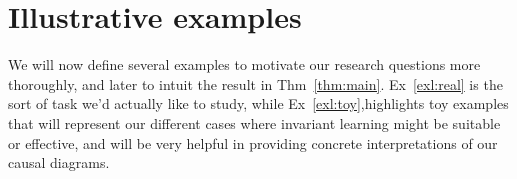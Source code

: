 \documentclass[12pt]{article}
\newcommand{\Ent}[1]{\operatorname{H}\left[#1\right]}
\newcommand{\E}[2][{}]{\mathbb{E}_{#1}\left[#2\right]}
\newcommand{\Prob}[1]{\operatorname{P}\left(#1\right)}
\newcommand{\toadd}[1]{\noindent\fbox{%
    \parbox{\textwidth}{%
        #1
    }%
}}
\theoremstyle{definition}
\newtheorem{dfn}[thm]{Definition}
\numberwithin{equation}{section}
\numberwithin{figure}{section}
\numberwithin{table}{section}
\begin{document}
    



\pagebreak
\section{Illustrative examples}
\label{sec:formalism}

We will now define several examples to motivate our research questions more thoroughly, and later to intuit the result in Thm~\ref{thm:main}. Ex~\ref{exl:real} is the sort of task we'd actually like to study, while Ex~\ref{exl:toy},highlights toy examples that will represent our different cases where invariant learning might be suitable or effective, and will be very helpful in providing concrete interpretations of our causal diagrams. 
\end{document}
